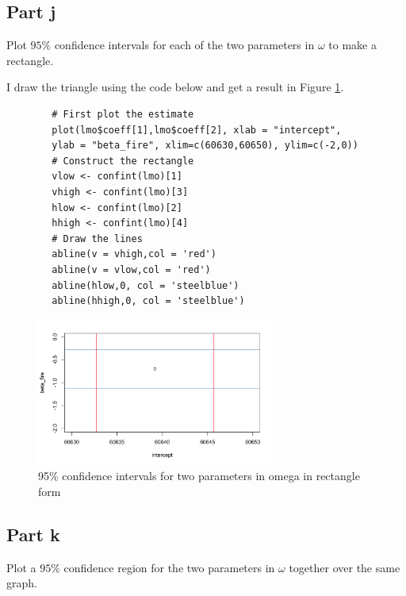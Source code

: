 \subsection{Part j}

\begin{question}
    Plot $95\%$ confidence intervals for each of the two parameters in $\omega$ to make a rectangle.
\end{question}

\begin{answer}
I draw the triangle using the code below and get a result in Figure \ref{fig:fig12}.
    \begin{verbatim}
        # First plot the estimate
        plot(lmo$coeff[1],lmo$coeff[2], xlab = "intercept",
        ylab = "beta_fire", xlim=c(60630,60650), ylim=c(-2,0))
        # Construct the rectangle
        vlow <- confint(lmo)[1]
        vhigh <- confint(lmo)[3]
        hlow <- confint(lmo)[2]
        hhigh <- confint(lmo)[4]
        # Draw the lines
        abline(v = vhigh,col = 'red')
        abline(v = vlow,col = 'red')
        abline(hlow,0, col = 'steelblue')
        abline(hhigh,0, col = 'steelblue')
    \end{verbatim}
    \begin{figure}[H]
        \centering
        \includegraphics[width=0.7\textwidth]{Figure 12.png}
        \caption{\label{fig:fig12}95\% confidence intervals for two parameters in omega in rectangle form}
    \end{figure}
\end{answer}

\subsection{Part k}

\begin{question}
    Plot a $95\%$ confidence region for the two parameters in $\omega$ together over the same graph.
\end{question}

